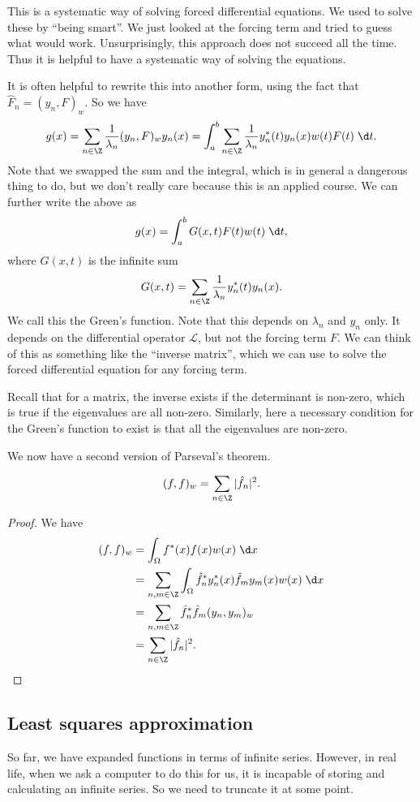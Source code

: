\documentclass[a4paper]{article}
\begin{document}
This is a systematic way of solving forced differential equations. We used to solve these by ``being smart''. We just looked at the forcing term and tried to guess what would work. Unsurprisingly, this approach does not succeed all the time. Thus it is helpful to have a systematic way of solving the equations.

It is often helpful to rewrite this into another form, using the fact that $\hat{F}_n = (y_n, F)_w$. So we have
\[
  g(x) = \sum_{n \in \Z}\frac{1}{\lambda_n}(y_n, F)_w y_n(x) = \int_a^b \sum_{n \in \Z}\frac{1}{\lambda_n} y_n^*(t) y_n(x) w(t) F(t)\;\d t.
\]
Note that we swapped the sum and the integral, which is in general a dangerous thing to do, but we don't really care because this is an applied course. We can further write the above as
\[
  g(x) = \int_a^b G(x, t) F(t) w(t)\;\d t,
\]
where $G(x, t)$ is the infinite sum
\[
  G(x, t) = \sum_{n \in \Z}\frac{1}{\lambda_n}y_n^*(t) y_n(x).
\]
We call this the Green's function. Note that this depends on $\lambda_n$ and $y_n$ only. It depends on the differential operator $\mathcal{L}$, but not the forcing term $F$. We can think of this as something like the ``inverse matrix'', which we can use to solve the forced differential equation for any forcing term.

Recall that for a matrix, the inverse exists if the determinant is non-zero, which is true if the eigenvalues are all non-zero. Similarly, here a necessary condition for the Green's function to exist is that all the eigenvalues are non-zero.

We now have a second version of Parseval's theorem.
\begin{thm}
  \[
    (f, f)_w = \sum_{n \in \Z}|\hat{f}_n|^2.
  \]
\end{thm}

\begin{proof}
  We have
  \begin{align*}
    (f, f)_w &= \int_\Omega f^*(x) f(x) w(x) \;\d x\\
    &= \sum_{n, m \in \Z}\int_\Omega \hat{f}^*_n y_n^*(x) \hat{f}_m y_m(x)w(x)\;\d x\\
    &= \sum_{n, m\in \Z}\hat{f}^*_n \hat{f}_m (y_n, y_m)_w \\
    &= \sum_{n \in \Z}|\hat{f}_n|^2.
  \end{align*}
\end{proof}

\subsection{Least squares approximation}
So far, we have expanded functions in terms of infinite series. However, in real life, when we ask a computer to do this for us, it is incapable of storing and calculating an infinite series. So we need to truncate it at some point.
\end{document}
